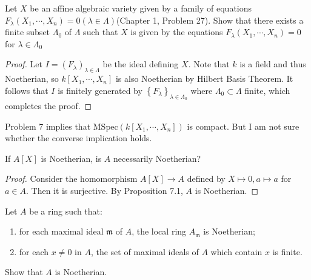 \documentclass{solution}
\begin{document}
\begin{problem}
    Let $X$ be an affine algebraic variety given by a family of equations $F_{\lambda}(X_1, \cdots, X_n) = 0(\lambda \in \Lambda)$(Chapter 1, Problem 27). Show that there exists a finite subset $\Lambda_0$ of $\Lambda$ such that $X$ is given by the equations $F_{\lambda}(X_1, \cdots, X_n) = 0$ for $\lambda \in \Lambda_0$
\end{problem}

\begin{proof}
    Let $I = (F_{\lambda})_{\lambda \in \Lambda}$ be the ideal defining $X$. Note that $k$ is a field and thus Noetherian, so $k[X_1, \cdots, X_n]$ is also Noetherian by Hilbert Basis Theorem. It follows that $I$ is finitely generated by $\left\lbrace F_{\lambda} \right\rbrace_{\lambda \in \Lambda_0}$ where $\Lambda_0 \subset \Lambda$ finite, which completes the proof.
\end{proof}

{\color{red} Problem 7 implies that $\mathrm{MSpec}(k[X_1, \cdots, X_n])$ is compact. But I am not sure whether the converse implication holds. \TODO}

\begin{problem}
    If $A[X]$ is Noetherian, is $A$ necessarily Noetherian?
\end{problem}

\begin{proof}
    Consider the homomorphism $A[X] \rightarrow A$ defined by $X \mapsto 0, a \mapsto a$ for $a \in A$. Then it is surjective. By Proposition 7.1, $A$ is Noetherian.
\end{proof}

\begin{problem}
    Let $A$ be a ring such that:
    \begin{enumerate}
        \item for each maximal ideal $\mathfrak{m}$ of $A$, the local ring $A_{\mathfrak{m}}$ is Noetherian;
        \item for each $x \ne 0$ in $A$, the set of maximal ideals of $A$ which contain $x$ is finite.
    \end{enumerate}
    Show that $A$ is Noetherian.
\end{problem}
\end{document}
